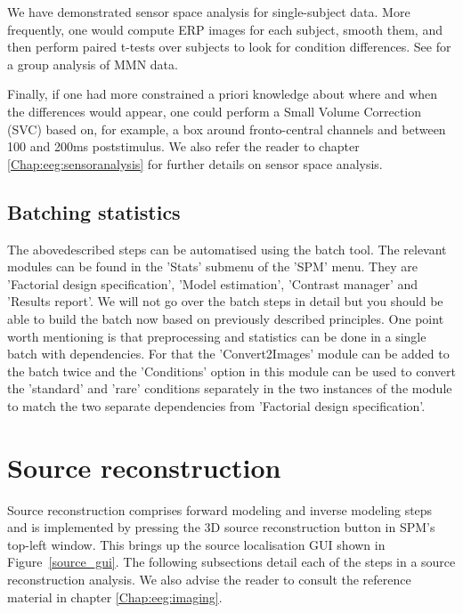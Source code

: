 We have demonstrated sensor space analysis for single-subject data. More frequently, one would compute ERP images for each subject, smooth them, and then perform paired t-tests over subjects to look for condition differences. See \cite{marta_mmndcm} for a group analysis of MMN data.
 
Finally, if one had more constrained a priori knowledge about where and when the differences would appear, one could perform a Small Volume Correction (SVC) based on, for example, a box around fronto-central channels and between 100 and 200ms poststimulus. We also refer the reader to chapter \ref{Chap:eeg:sensoranalysis} for further details on sensor space analysis.

\subsection{Batching statistics}
The abovedescribed steps can be automatised using the batch tool. The relevant modules can be found in the 'Stats' submenu of the 'SPM' menu. They are 'Factorial design specification', 'Model estimation', 'Contrast manager' and 'Results report'. We will not go over the batch steps in detail but you should be able to build the batch now based on previously described principles. One point worth mentioning is that preprocessing and statistics can be done in a single batch with dependencies. For that the 'Convert2Images' module can be added to the batch twice and the 'Conditions' option in this module can be used to convert the 'standard' and 'rare' conditions separately  in the two instances of the module to match the two separate dependencies from 'Factorial design specification'. 

\section{Source reconstruction}

Source reconstruction comprises forward modeling and inverse modeling steps and is implemented by pressing the 3D source reconstruction button in SPM's top-left window.
This brings up the source localisation GUI shown in Figure~\ref{source_gui}. The following subsections detail each of the steps in a source reconstruction analysis. We also advise the reader to consult the reference material in chapter \ref{Chap:eeg:imaging}.

